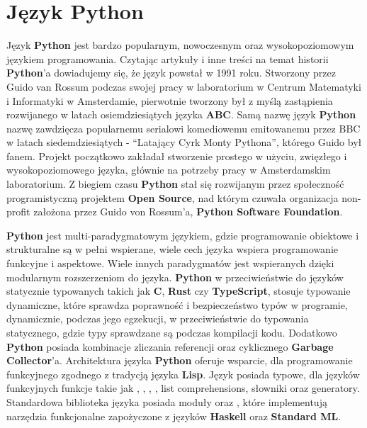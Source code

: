 


\section{Język Python}
Język \textbf{Python} \cite{IntroducingPython} \cite{AdvancedPythonDevelopment} \cite{ExpertPythonProgramming} jest bardzo popularnym, nowoczesnym oraz wysokopoziomowym językiem programowania. Czytając artykuły i inne treści na temat historii \textbf{Python}'a \cite{HistoriaPythona} \cite{WikipediaPythonProgrammingLanauge} dowiadujemy się, że język powstał w 1991 roku. Stworzony przez Guido van Rossum podczas swojej pracy w laboratorium w Centrum Matematyki i Informatyki w Amsterdamie, pierwotnie tworzony był z myślą zastąpienia rozwijanego w latach osiemdziesiątych języka \textbf{ABC}. Samą nazwę język \textbf{Python} nazwę zawdzięcza popularnemu serialowi komediowemu emitowanemu przez BBC w latach siedemdziesiątych - ``Latający Cyrk Monty Pythona'', którego Guido był fanem.
Projekt początkowo zakładał stworzenie prostego w użyciu, zwięzłego i wysokopoziomowego języka, głównie na potrzeby pracy w Amsterdamskim laboratorium. Z biegiem czasu \textbf{Python} stał się rozwijanym przez społeczność programistyczną projektem \textbf{Open Source}, nad którym czuwała organizacja non-profit założona przez Guido von Rossum'a, \textbf{Python Software Foundation}.

\textbf{Python} jest multi-paradygmatowym językiem, gdzie programowanie obiektowe i strukturalne są w pełni wspierane, wiele cech języka wspiera programowanie funkcyjne i aspektowe. Wiele innych paradygmatów jest wspieranych dzięki modularnym rozszerzeniom do języka.
\textbf{Python} w przeciwieństwie do języków statycznie typowanych takich jak \textbf{C}, \textbf{Rust} czy \textbf{TypeScript}, stosuje typowanie dynamiczne, które sprawdza poprawność i bezpieczeństwo typów w programie, dynamicznie, podczas jego egzekucji, w przeciwieństwie do typowania statycznego, gdzie typy sprawdzane są podczas kompilacji kodu. Dodatkowo \textbf{Python} posiada kombinacje zliczania referencji oraz cyklicznego \textbf{Garbage Collector}'a.
Architektura języka \textbf{Python} oferuje wsparcie, dla programowanie funkcyjnego zgodnego z tradycją języka \textbf{Lisp}. Język posiada typowe, dla języków funkcyjnych funkcje takie jak , , , , list comprehensions, słowniki oraz generatory. Standardowa biblioteka języka posiada moduły  oraz , które implementują narzędzia funkcjonalne zapożyczone z języków \textbf{Haskell} oraz \textbf{Standard ML}.

